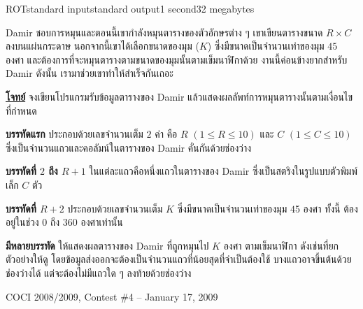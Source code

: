 \documentclass[11pt,a4paper]{article}
\begin{document}
\begin{problem}{ROT}{standard input}{standard output}{1 second}{32 megabytes}

Damir ชอบการหมุนและตอนนี้เขากำลังหมุนตารางของตัวอักษรต่าง ๆ    เขาเขียนตารางขนาด $R \times C$ ลงบนแผ่นกระดาษ    นอกจากนี้เขาได้เลือกขนาดของมุม ($K$) ซึ่งมีขนาดเป็นจำนวนเท่าของมุม $45$ องศา และต้องการที่จะหมุนตารางตามขนาดของมุมนั้นตามเข็มนาฬิกาด้วย งานนี้ค่อนข้างยากสำหรับ Damir ดังนั้น เรามาช่วยเขาทำให้สำเร็จกันเถอะ

    

\bigskip
\underline{\textbf{โจทย์}}  จงเขียนโปรแกรมรับข้อมูลตารางของ Damir แล้วแสดงผลลัพท์การหมุนตารางนั้นตามเงื่อนไขที่กำหนด


\InputFile

\textbf{บรรทัดแรก} ประกอบด้วยเลขจำนวนเต็ม $2$ ค่า คือ $R$ $(1 \leq R \leq 10)$ และ $C$ $(1 \leq C \leq 10)$  ซึ่งเป็นจำนวนแถวและคอลัมน์ในตารางของ Damir คั่นกันด้วยช่องว่าง

\textbf{บรรทัดที่ $2$ ถึง $R+1$} ในแต่ละแถวคือหนึ่งแถวในตารางของ Damir ซึ่งเป็นสตริงในรูปแบบตัวพิมพ์เล็ก $C$ ตัว

\textbf{บรรทัดที่ $R+2$} ประกอบด้วยเลขจำนวนเต็ม $K$ ซึ่งมีขนาดเป็นจำนวนเท่าของมุม $4$5 องศา   ทั้งนี้ ต้องอยู่ในช่วง $0$ ถึง $360$ องศาเท่านั้น




\OutputFile

\textbf{มีหลายบรรทัด} ให้แสดงผลตารางของ Damir ที่ถูกหมุนไป $K$ องศา ตามเข็มนาฬิกา ดังเช่นที่ยกตัวอย่างให้ดู โดยข้อมูลส่งออกจะต้องเป็นจำนวนแถวที่น้อยสุดที่จำเป็นต้องใช้ บางแถวอาจขึ้นต้นด้วยช่องว่างได้ แต่จะต้องไม่มีแถวใด ๆ ลงท้ายด้วยช่องว่าง

\Examples

\begin{example}
%
%
%
\end{example}

  
\Source

COCI 2008/2009, Contest \#4 – January 17, 2009

\end{problem}
\end{document}
